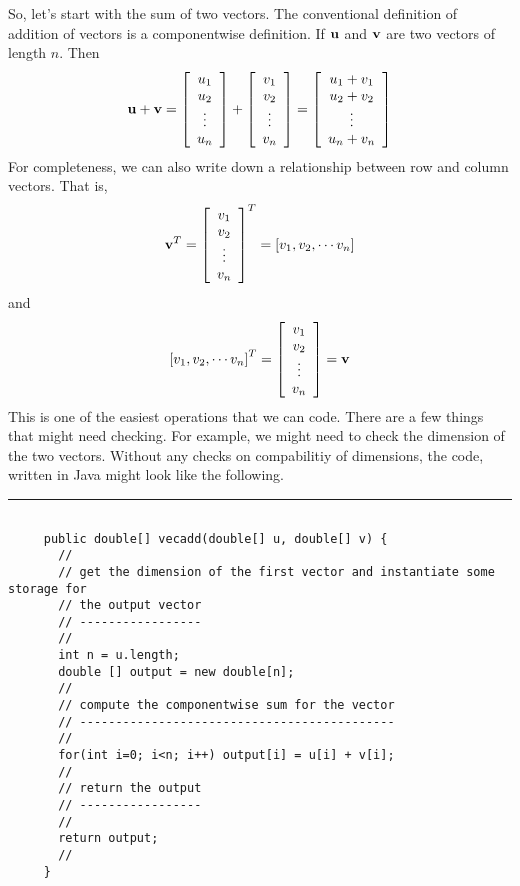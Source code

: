 \documentclass[10pt,fleqn]{article}
\begin{document}
So, let's start with the sum of two vectors. The conventional definition of
addition of vectors is a componentwise definition. If ${\bf u}$ and ${\bf v}$
are two vectors of length $n$. Then
$$
  {\bf u} + {\bf v} = 
       \left[
         \begin{array}{c}
           u_1 \\
           u_2 \\
           \vdots \\
           u_n
         \end{array}
       \right]
     + \left[
         \begin{array}{c}
           v_1 \\
           v_2 \\
           \vdots \\
           v_n
         \end{array}
       \right]
     = \left[
         \begin{array}{c}
           u_1 + v_1 \\
           u_2 + v_2 \\
           \vdots \\
           u_n + v_n
         \end{array}
       \right]
$$
For completeness, we can also write down a relationship between row and column
vectors. That is,
$$
  {\bf v}^T = 
       \left[
         \begin{array}{c}
           v_1 \\
           v_2 \\
           \vdots \\
           v_n
         \end{array}
       \right]^T
     = \left[
         v_1, v_2, \cdots v_n
       \right]
$$
and
\noindent
$$
  \left[ v_1, v_2, \cdots v_n \right]^T
     = \left[
         \begin{array}{c}
           v_1 \\
           v_2 \\
           \vdots \\
           v_n
         \end{array}
       \right] = {\bf v}
$$
This is one of the easiest operations that we can code. There are a few things
that might need checking. For example, we might need to check the dimension of
the two vectors. Without any checks on compabilitiy of dimensions, the code,
written in Java might look like the following.
\vskip0.1in\hrule\vskip0.1in
\begin{verbatim}

     public double[] vecadd(double[] u, double[] v) {
       //
       // get the dimension of the first vector and instantiate some storage for
       // the output vector
       // -----------------
       //
       int n = u.length;
       double [] output = new double[n];
       //
       // compute the componentwise sum for the vector
       // --------------------------------------------
       //
       for(int i=0; i<n; i++) output[i] = u[i] + v[i];
       //
       // return the output
       // -----------------
       //
       return output;
       //
     }

\end{verbatim}
\end{document}

